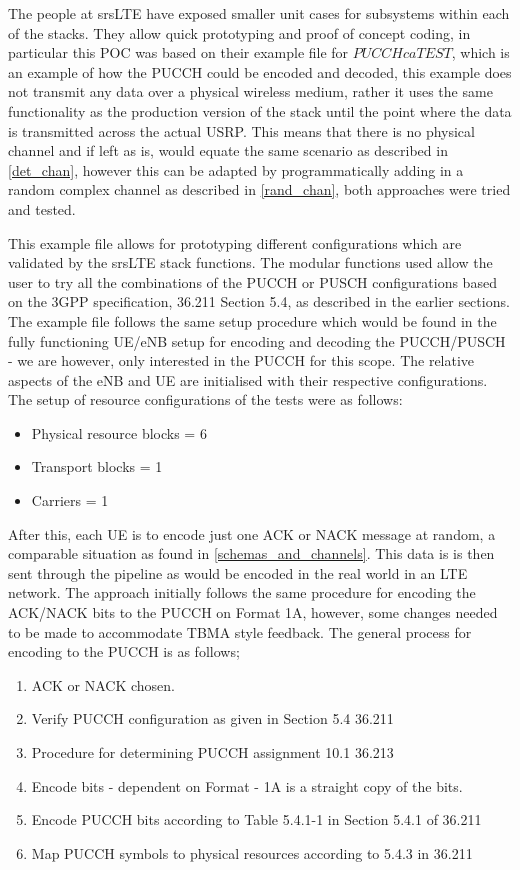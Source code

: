 \documentclass{article}
\begin{document}
The people at srsLTE have exposed smaller unit cases for subsystems within each of the stacks. They allow quick prototyping and proof of concept coding, in particular this POC was based on their example file for $PUCCH ca TEST$, which is an example of how the PUCCH could be encoded and decoded, this example does not transmit any data over a physical wireless medium, rather it uses the same functionality as the production version of the stack until the point where the data is transmitted across the actual USRP. This means that there is no physical channel and if left as is, would equate the same scenario as described in \cref{det_chan}, however this can be adapted by programmatically adding in a random complex channel as described in \cref{rand_chan}, both approaches were tried and tested. 

This example file allows for prototyping different configurations which are validated by the srsLTE stack functions. The modular functions used allow the user to try all the combinations of the PUCCH or PUSCH configurations based on the 3GPP specification, 36.211 Section 5.4, as described in the earlier sections. The example file follows the same setup procedure which would be found in the fully functioning UE/eNB setup for encoding and decoding the PUCCH/PUSCH - we are however, only interested in the PUCCH for this scope. The relative aspects of the eNB and UE are initialised with their respective configurations. The setup of resource configurations of the tests were as follows:

\begin{itemize}
    \item Physical resource blocks = 6
    \item Transport blocks = 1
    \item Carriers = 1
\end{itemize}

After this, each UE is to encode just one ACK or NACK message at random, a comparable situation as found in \cref{schemas_and_channels}. This data is is then sent through the pipeline as would be encoded in the real world in an LTE network. The approach initially follows the same procedure for encoding the ACK/NACK bits to the PUCCH on Format 1A, however, some changes needed to be made to accommodate TBMA style feedback. The general process for encoding to the PUCCH is as follows;

\begin{enumerate}
\label{encode_pucch_proc}
    \item ACK or NACK chosen.
    \item Verify PUCCH configuration as given in Section 5.4 36.211 
    \item Procedure for determining PUCCH assignment 10.1 36.213
    \item Encode bits - dependent on Format - 1A is a straight copy of the bits. 
    \item Encode PUCCH bits according to Table 5.4.1-1 in Section 5.4.1 of 36.211
    \item Map PUCCH symbols to physical resources according to 5.4.3 in 36.211
\end{enumerate}
 
\end{document}
